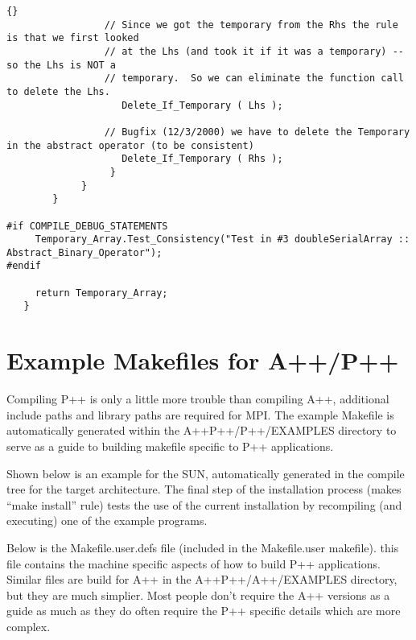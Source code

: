 \documentclass[10pt]{llncs}
\begin{document}
\begin{lstlisting}{}
                 // Since we got the temporary from the Rhs the rule is that we first looked
                 // at the Lhs (and took it if it was a temporary) -- so the Lhs is NOT a 
                 // temporary.  So we can eliminate the function call to delete the Lhs.
                    Delete_If_Temporary ( Lhs );

                 // Bugfix (12/3/2000) we have to delete the Temporary in the abstract operator (to be consistent)
                    Delete_If_Temporary ( Rhs );
                  }
             }
        }

#if COMPILE_DEBUG_STATEMENTS
     Temporary_Array.Test_Consistency("Test in #3 doubleSerialArray :: Abstract_Binary_Operator");
#endif

     return Temporary_Array;
   }

\end{lstlisting}



\newpage
\section{Example Makefiles for A++/P++}

   Compiling P++ is only a little more trouble than compiling A++, additional include paths and
library paths are required for MPI.  The example Makefile is automatically generated within the
A++P++/P++/EXAMPLES directory to serve as a guide to building makefile specific to P++ applications.

   Shown below is an example for the SUN, automatically generated in the compile tree for the target
architecture.  The final step of the installation process (makes ``make install'' rule) tests
the use of the current installation by recompiling (and executing) one of the example programs.

\vspace{0.5in}

Below is the Makefile.user.defs file (included in the Makefile.user makefile).  this file contains
the machine specific aspects of how to build P++ applications.  Similar files are build for A++ in
the A++P++/A++/EXAMPLES directory, but they are much simplier.  Most people don't require the A++
versions as a guide as much as they do often require the P++ specific details which are more
complex.
\end{document}
